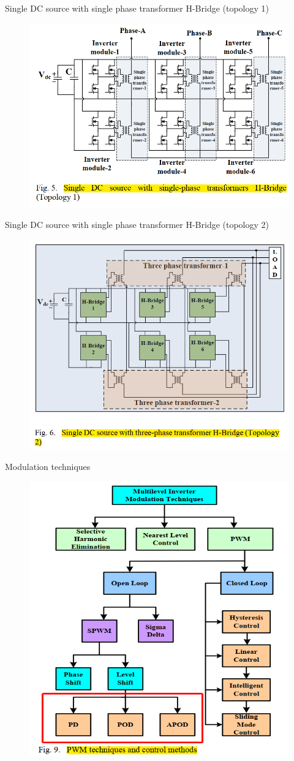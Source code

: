 \documentclass[
	11pt, %
]{beamer}
\begin{document}
\begin{frame}{Single DC source with single phase transformer H-Bridge (topology 1)}
	\begin{figure}
		\includegraphics[width=0.7\linewidth]{Topology1.png}
	\end{figure}
\end{frame}

\begin{frame}{Single DC source with single phase transformer H-Bridge (topology 2)}
	\begin{figure}
		\includegraphics[width=0.6\linewidth]{Topology2.png}
	\end{figure}
\end{frame}

\begin{frame}{Modulation techniques}
    \begin{figure}
        \includegraphics[width=0.45\linewidth]{PWD.png}
    \end{figure}
\end{frame}
\end{document}
